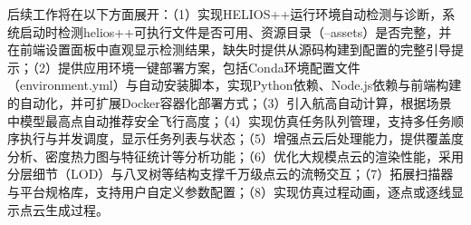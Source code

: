 \documentclass[a4paper,fleqn]{cas-sc}
\begin{document}
后续工作将在以下方面展开：（1）实现HELIOS++运行环境自动检测与诊断，系统启动时检测helios++可执行文件是否可用、资源目录（--assets）是否完整，并在前端设置面板中直观显示检测结果，缺失时提供从源码构建到配置的完整引导提示；（2）提供应用环境一键部署方案，包括Conda环境配置文件（environment.yml）与自动安装脚本，实现Python依赖、Node.js依赖与前端构建的自动化，并可扩展Docker容器化部署方式；（3）引入航高自动计算，根据场景中模型最高点自动推荐安全飞行高度；（4）实现仿真任务队列管理，支持多任务顺序执行与并发调度，显示任务列表与状态；（5）增强点云后处理能力，提供覆盖度分析、密度热力图与特征统计等分析功能；（6）优化大规模点云的渲染性能，采用分层细节（LOD）与八叉树等结构支撑千万级点云的流畅交互；（7）拓展扫描器与平台规格库，支持用户自定义参数配置；（8）实现仿真过程动画，逐点或逐线显示点云生成过程。

\printcredits




\end{document}
